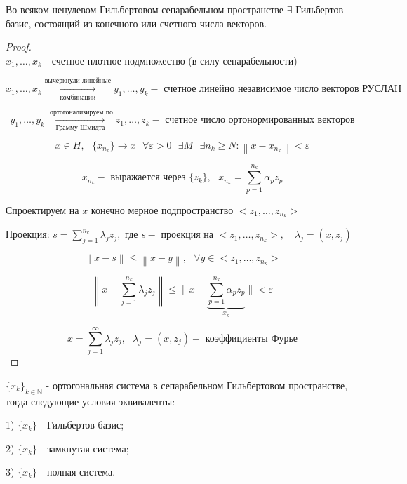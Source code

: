 \documentclass[12pt, a4paper]{report}
\begin{document}
\begin{theorem}
    Во всяком ненулевом Гильбертовом сепарабельном пространстве \( \exists  \)  Гильбертов базис, состоящий из конечного или счетного числа векторов.
\end{theorem}


\begin{proof}
    \[  \] 
    \( x_1, \ldots, x_k \)  - счетное плотное подмножество (в силу сепарабельности)

    \[ x_1, \ldots, x_k  \underset{\text{комбинации} }{\xrightarrow{\text{вычеркнули линейные} }} y_1, \ldots, y_k  - \text{ счетное линейно независимое число векторов РУСЛАН}  \] 

    \[ y_1, \ldots, y_k \underset{\text{Грамму-Шмидта} }{\xrightarrow{\text{ ортогонализируем по} }} z_1, \ldots, z_k - \text{ счетное число ортонормированных  векторов}  \] 

    \[ x \in  H , \text{ } \{x_{n_k} \} \to  x \text{ } \forall  \varepsilon > 0 \text{ } \exists  M \text{ } \exists  n_k \geq  N : \left\lVert x - x_{n_k}  \right\rVert < \varepsilon \] 

    \[ x_{n_k}  - \text{ выражается через } \{z_k\} , \text{ }  x_{n_k} = \sum_{p=1} ^{n_k } \alpha_p z_p \] 

    Спроектируем на \( x \)  конечно мерное подпространство \( <z_1, \ldots, z_{n_k} > \) 

    Проекция: \( \displaystyle  s = \sum_{j =1} ^{n_k }\lambda_j z_j , \text{ где } s - \text{ проекция на } <z_1, \ldots, z_{n_k}>   , \quad  \lambda_j = (x , z_j) \) 

    \[ \left\lVert  x - s  \right\rVert  \le  \left\lVert x -y  \right\rVert , \text{ } \forall  y \in  <z_1, \ldots, z_{n_k} > \] 


    \[ \left\lVert x - \sum _{j=1} ^{n_k } \lambda_j z_j \right\rVert \le  \bigg\lVert  x- \underbrace{\sum_{p=1}^{n_k} \alpha_p z_p}_{x_k}  \bigg\rVert < \varepsilon\] 

    \[ x = \sum_{j =1} ^{ \infty } \lambda_j z_j ,\text{ }   \lambda_j = (x , z_j) - \text{ коэффициенты Фурье}   \] 
    
\end{proof}

\begin{theorem}
    \( \{x_k\}_{k \in  \mathbb{N}}  \)  - ортогональная система в сепарабельном Гильбертовом пространстве, тогда следующие условия эквиваленты: 

    1) \( \{x_k\} \)  - Гильбертов базис; 

    2) \( \{x_k\} \) - замкнутая система; 

    3) \( \{x_k\} \) - полная система.
\end{theorem}
\end{document}
